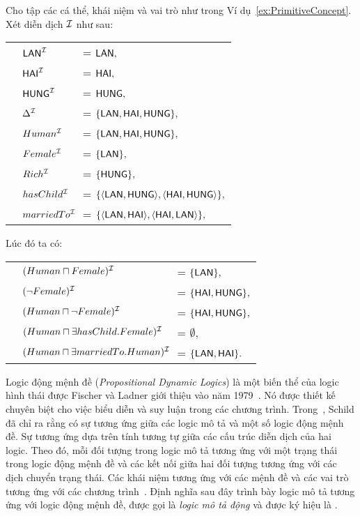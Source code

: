\begin{Example}
Cho tập các cá thể, khái niệm và vai trò như trong Ví dụ~\ref{ex:PrimitiveConcept}. Xét diễn dịch $\mathcal{I}$ như sau:\\[1.0ex]
\begin{tabular}{c l l}
	& $\mathsf{LAN}^{\mathcal{I}}$      & = $\mathsf{LAN},$\\[0.5ex]
	& $\mathsf{HAI}^{\mathcal{I}}$      & = $\mathsf{HAI},$\\[0.5ex]
	& $\mathsf{HUNG}^{\mathcal{I}}$     & = $\mathsf{HUNG},$\\[0.5ex]
	& $\Delta^{\mathcal{I}}$     & = $\{\mathsf{LAN}, \mathsf{HAI}, \mathsf{HUNG}\},$\\[0.5ex]
	& $Human^{\mathcal{I}}$     & = $\{\mathsf{LAN}, \mathsf{HAI}, \mathsf{HUNG}\},$\\[0.5ex]
	& $Female^{\mathcal{I}}$    & = $\{\mathsf{LAN}\},$ \\[0.5ex]
	& $Rich^{\mathcal{I}}$      & = $\{\mathsf{HUNG}\},$\\
	& $hasChild^{\mathcal{I}}$  & = $\{\left\langle\mathsf{LAN}, \mathsf{HUNG}\right\rangle\!, \left\langle\mathsf{HAI}, \mathsf{HUNG}\right\rangle\!\,\},$ \\[0.5ex]
	& $marriedTo^{\mathcal{I}}\!\!\!$ & = $\{\left\langle\mathsf{LAN}, \mathsf{HAI}\right\rangle\!,\left\langle\mathsf{HAI}, \mathsf{LAN}\right\rangle\!\,\},$
\end{tabular}

\noindent
Lúc đó ta có:\\[1.0ex]
\begin{tabular}{c l l}
	& $(Human \sqcap Female)^{\mathcal{I}}$ & = $\{\mathsf{LAN}\},$\\[0.5ex]
	& $(\neg Female)^{\mathcal{I}}$ & = $\{\mathsf{HAI}, \mathsf{HUNG}\},$\\[0.5ex]
	& $(Human \sqcap \neg Female)^{\mathcal{I}}$ & = $\{\mathsf{HAI}, \mathsf{HUNG}\},$\\[0.5ex]
	& $(Human \sqcap \exists hasChild.Female)^{\mathcal{I}}$ & = $\emptyset,$\\[0.5ex]
	& $(Human \sqcap \exists marriedTo.Human)^{\mathcal{I}}\!\!\!$ & = $\{\mathsf{LAN}, \mathsf{HAI}\}.$\hspace{5.40cm} \myend
\end{tabular}
\end{Example}

Logic động mệnh đề ({\em Propositional Dynamic Logics}) là một biến thể của logic hình thái được Fischer và Ladner giới thiệu vào năm 1979~\cite{Fischer1979}. Nó được thiết kế chuyên biệt cho việc biểu diễn và suy luận trong các chương trình. Trong~\cite{Schild1991}, Schild đã chỉ ra rằng có sự tương ứng giữa các logic mô tả và một số logic động mệnh đề. 
Sự tương ứng dựa trên tính tương tự giữa các cấu trúc diễn dịch của hai logic. Theo đó, mỗi đối tượng trong logic mô tả tương ứng với một trạng thái trong logic động mệnh đề và các kết nối giữa hai đối tượng tương ứng với các dịch chuyển trạng thái. Các khái niệm tương ứng với các mệnh đề và các vai trò tương ứng với các chương trình~\cite{Giacomo1994,Chang2007}.
Định nghĩa sau đây trình bày logic mô tả \ALC tương ứng với logic động mệnh đề, được gọi là {\em logic mô tả động} và được ký hiệu là \ALCreg.

